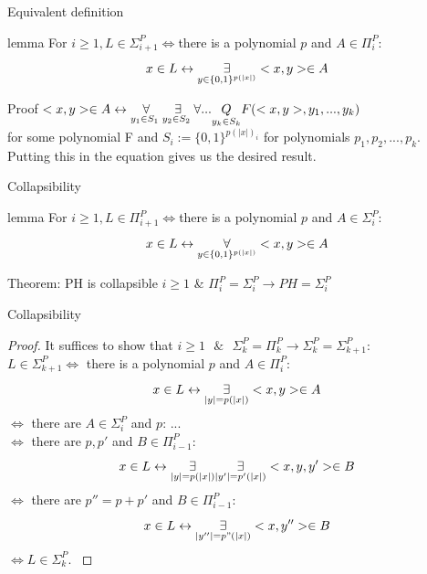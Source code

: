         \begin{frame}{Equivalent definition}
            \begin{block}{lemma}
                For $i\geq 1, L \in  \Sigma_{i+1}^P \iff $there is a polynomial $p$ and $A \in \Pi_i^P$:
                $$x \in L \leftrightarrow \overset{{}}{\underset{{y\in \{0,1\}^{p(|x|)}}}{\Large \exists}} <x,y> \in A$$
            \end{block}
            \pause
            \begin{block}{Proof}
                $<x,y> \in A \leftrightarrow \overset{{}}{\underset{{y_1 \in S_1\text{ }}}{\Large \forall}}
                    \overset{{}}{\underset{{y_2 \in S_2\text{ }}}{\Large \exists}}
                    \forall ...\underset{y_k \in S_k}{Q} F(<x,y>,y_1,...,y_k)$\\
                for some polynomial F and $S_i := \{0,1\}^{p(|x|)_i}$ for polynomials $p_1,p_2,..., p_k$. Putting this in the equation gives us the desired result.
            \end{block}
        \end{frame}

        \begin{frame}{Collapsibility}
            \begin{block}{lemma}
                For $i\geq 1, L \in  \Pi_{i+1}^P \iff $there is a polynomial $p$ and $A \in \Sigma_i^P$:
                $$x \in L \leftrightarrow \overset{{}}{\underset{{y\in \{0,1\}^{p(|x|)}}}{\Large \forall}} <x,y> \in A$$
            \end{block}
            \pause
            \begin{block}{Theorem: PH is collapsible}            
                $i \geq 1 $ \& $ \Pi_i^P = \Sigma_i^P \to PH = \Sigma_i^P$
            \end{block}
        \end{frame}

        \begin{frame}{Collapsibility}
            \begin{proof}
                \small{
                It suffices to show that 
                $i\geq1 \text{ $\&$ } \Sigma_k^P = \Pi_k^P 
                \to \Sigma_k^P = \Sigma_{k+1}^P$:\\
                $L \in \Sigma_{k+1}^P \iff$ there is a polynomial $p$ and $A \in \Pi_i^P$:
                $$x \in L \leftrightarrow \overset{{}}{\underset{{|y|=p(|x|)}}{\Large \exists}} <x,y> \in A$$
                $\iff$ there are $A \in \Sigma_i^P$ and $p$:
                 $...$\\
                $\iff$ there are $p,p'$ and $B \in \Pi_{i-1}^P$:
                $$x \in L \leftrightarrow \overset{{}}{\underset{{|y|=p(|x|)}}{\Large \exists}} \overset{{}}{\underset{{|y'|=p'(|x|)}}{\Large \exists}} <x,y,y'> \in B$$
                $\iff$ there are $p'' = p+p'$ and $B \in \Pi_{i-1}^P$:
                $$x \in L \leftrightarrow \overset{{}}{\underset{{|y''|=p"(|x|)}}{\Large \exists}} <x,y''> \in B$$
                $\iff L \in \Sigma_k^P$.
                }
            \end{proof}
        \end{frame}
            

